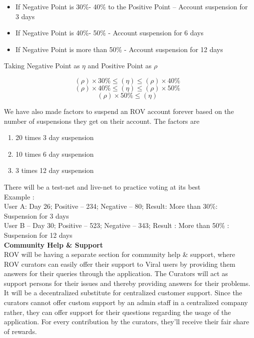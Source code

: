 \documentclass[conference]{IEEEtran}
\begin{document}
\begin{itemize}[wide, labelwidth=!, labelindent=0pt]
\item If Negative Point is 30\%- 40\% to the Positive Point – Account suspension for 3 days
\item If Negative Point is 40\%- 50\% - Account suspension for 6 days
\item If Negative Point is more than 50\% - Account suspension for 12 days
\end{itemize} 

Taking Negative Point as $\eta$ and Positive Point as $\rho$

\[(\rho) \times  30\% \leq (\eta) \leq (\rho) \times  40\%\]
\[(\rho) \times  40\% \leq (\eta) \leq (\rho) \times  50\%\]
\[(\rho) \times 50\% \leq (\eta)\]

We have also made factors to suspend an ROV account forever based on the number of suspensions they get on their account. The factors are
\begin{enumerate}[wide, labelwidth=!, labelindent=0pt]
\item 20 times 3 day suspension 
\item 10 times 6 day suspension
\item 3 times 12 day suspension
\end{enumerate}

There will be a test-net and live-net to practice voting at its best\\

Example : \\

User A: Day 26; Positive – 234; Negative – 80; Result: More than 30\%: Suspension for 3 days\\
User B – Day 30; Positive – 523; Negative – 343; Result : More than 50\% : Suspension for 12 days\\


\textbf{Community Help \& Support}\\

ROV will be having a separate section for community help \& support, where ROV curators can easily offer their support to Viral users by providing them answers for their queries through the application. The Curators will act as support persons for their issues and thereby providing answers for their problems. It will be a decentralized substitute for centralized customer support. Since the curators cannot offer custom support by an admin staff in a centralized company rather, they can offer support for their questions regarding the usage of the application. For every contribution by the curators, they’ll receive their fair share of rewards.\\
\end{document}
